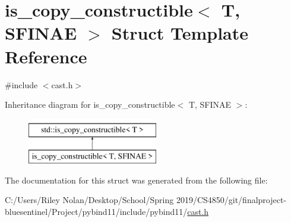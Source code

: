 \hypertarget{structis__copy__constructible}{}\section{is\+\_\+copy\+\_\+constructible$<$ T, S\+F\+I\+N\+AE $>$ Struct Template Reference}
\label{structis__copy__constructible}


{\ttfamily \#include $<$cast.\+h$>$}

Inheritance diagram for is\+\_\+copy\+\_\+constructible$<$ T, S\+F\+I\+N\+AE $>$\+:\begin{figure}[H]
\begin{center}
\leavevmode
\includegraphics[height=2.000000cm]{structis__copy__constructible}
\end{center}
\end{figure}


The documentation for this struct was generated from the following file\+:\begin{DoxyCompactItemize}
\item 
C\+:/\+Users/\+Riley Nolan/\+Desktop/\+School/\+Spring 2019/\+C\+S4850/git/finalproject-\/bluesentinel/\+Project/pybind11/include/pybind11/\mbox{\hyperlink{cast_8h}{cast.\+h}}\end{DoxyCompactItemize}
